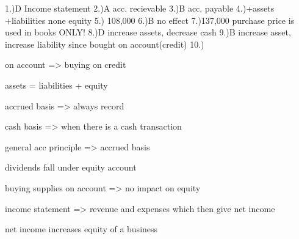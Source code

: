 1.)D Income statement
2.)A acc. recievable
3.)B acc. payable
4.)+assets +liabilities none equity
5.) 108,000
6.)B no effect
7.)137,000 purchase price is used in books ONLY!
8.)D increase assets, decrease cash
9.)B increase asset, increase liability since bought on account(credit)
10.)

on account => buying on credit


assets = liabilities + equity

accrued basis => always record 

cash basis => when there is a cash transaction

general acc principle => accrued basis 

dividends fall under equity account

buying supplies on account => no impact on equity

income statement => revenue and expenses which then give net income

net income increases equity of a business



